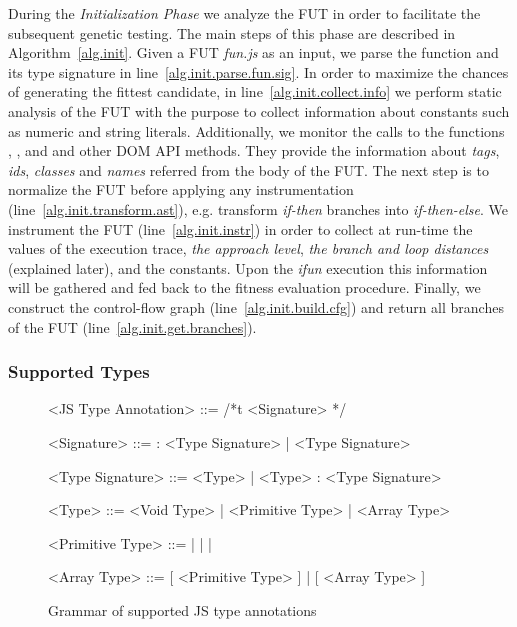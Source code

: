 During the \emph{Initialization Phase} we analyze the FUT in order to facilitate the subsequent genetic testing. The main steps of this phase are described in Algorithm~\ref{alg.init}. Given a FUT \emph{fun.js} as an input, we parse the function and its type signature in line~\ref{alg.init.parse.fun.sig}. In order to maximize the chances of generating the fittest candidate, in line~\ref{alg.init.collect.info} we perform static analysis of the FUT with the purpose to collect information about constants such as numeric and string literals. Additionally, we monitor the calls to the functions , , and  and other DOM API methods. They provide the information about \emph{tags}, \emph{ids}, \emph{classes} and \emph{names} referred from the body of the FUT. The next step is to normalize the FUT before applying any instrumentation (line~\ref{alg.init.transform.ast}), e.g. transform \emph{if-then} branches into \emph{if-then-else}. We instrument the FUT (line~\ref{alg.init.instr}) in order to collect at run-time the values of the execution trace, \emph{the approach level}, \emph{the branch and loop distances} (explained later), and the constants. Upon the \emph{ifun} execution this information will be gathered and fed back to the fitness evaluation procedure. Finally, we construct the control-flow graph (line~\ref{alg.init.build.cfg}) and return all branches of the FUT (line~\ref{alg.init.get.branches}).

\subsubsection{Supported Types}
\label{sub.sec.sup.types}

\begin{figure}[!t]
\setlength{\grammarparsep}{3pt}
\scriptsize
\begin{grammar}
<JS Type Annotation> ::= /*t <Signature> */

<Signature> ::=  : <Type Signature> | <Type Signature>

<Type Signature> ::= <Type> | <Type> : <Type Signature>

<Type> ::= <Void Type> | <Primitive Type> | <Array Type>

<Primitive Type> ::=  |  |  | 

<Array Type> ::= [ <Primitive Type> ] | [ <Array Type> ]
\end{grammar}
\caption{Grammar of supported JS type annotations}
\label{fig.js.type.annot}
\end{figure}

